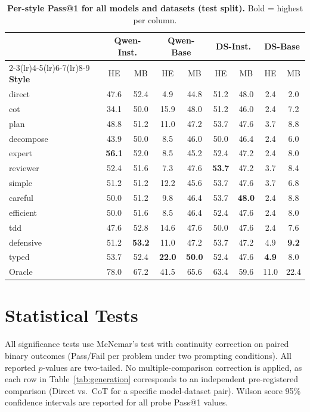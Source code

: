 \documentclass[11pt]{article}
\begin{document}
\begin{table}[t]
    \centering
    \caption{\textbf{Per-style Pass@1 for all models and datasets (test split).} Bold = highest per column.}
    \label{tab:all_styles}
    \small
    \begin{tabular}{lcccccccc}
        \toprule
        & \multicolumn{2}{c}{\textbf{Qwen-Inst.}} & \multicolumn{2}{c}{\textbf{Qwen-Base}} & \multicolumn{2}{c}{\textbf{DS-Inst.}} & \multicolumn{2}{c}{\textbf{DS-Base}} \\
        \cmidrule(lr){2-3}\cmidrule(lr){4-5}\cmidrule(lr){6-7}\cmidrule(lr){8-9}
        \textbf{Style} & HE & MB & HE & MB & HE & MB & HE & MB \\
        \midrule
        direct     & 47.6 & 52.4 & 4.9  & 44.8 & 51.2 & 48.0 & 2.4  & 2.0  \\
        cot        & 34.1 & 50.0 & 15.9 & 48.0 & 51.2 & 46.0 & 2.4  & 7.2  \\
        plan       & 48.8 & 51.2 & 11.0 & 47.2 & 53.7 & 47.6 & 3.7  & 8.8  \\
        decompose  & 43.9 & 50.0 & 8.5  & 46.0 & 50.0 & 46.4 & 2.4  & 6.0  \\
        expert     & \textbf{56.1} & 52.0 & 8.5  & 45.2 & 52.4 & 47.2 & 2.4  & 8.0  \\
        reviewer   & 52.4 & 51.6 & 7.3  & 47.6 & \textbf{53.7} & 47.2 & 3.7  & 8.4  \\
        simple     & 51.2 & 51.2 & 12.2 & 45.6 & 53.7 & 47.6 & 3.7  & 6.8  \\
        careful    & 50.0 & 51.2 & 9.8  & 46.4 & 53.7 & \textbf{48.0} & 2.4  & 8.8  \\
        efficient  & 50.0 & 51.6 & 8.5  & 46.4 & 52.4 & 47.6 & 2.4  & 8.0  \\
        tdd        & 47.6 & 52.8 & 14.6 & 47.6 & 50.0 & 47.6 & 2.4  & 7.6  \\
        defensive  & 51.2 & \textbf{53.2} & 11.0 & 47.2 & 53.7 & 47.2 & 4.9  & \textbf{9.2} \\
        typed      & 53.7 & 52.4 & \textbf{22.0} & \textbf{50.0} & 52.4 & 47.6 & \textbf{4.9} & 8.0  \\
        \midrule
        Oracle     & 78.0 & 67.2 & 41.5 & 65.6 & 63.4 & 59.6 & 11.0 & 22.4 \\
        \bottomrule
    \end{tabular}
\end{table}

\section{Statistical Tests}
\label{app:stats}

All significance tests use McNemar's test with continuity correction on paired binary outcomes (Pass/Fail per problem under two prompting conditions). All reported $p$-values are two-tailed. No multiple-comparison correction is applied, as each row in Table~\ref{tab:generation} corresponds to an independent pre-registered comparison (Direct vs.\ CoT for a specific model-dataset pair). Wilson score 95\% confidence intervals are reported for all probe Pass@1 values.
\end{document}
